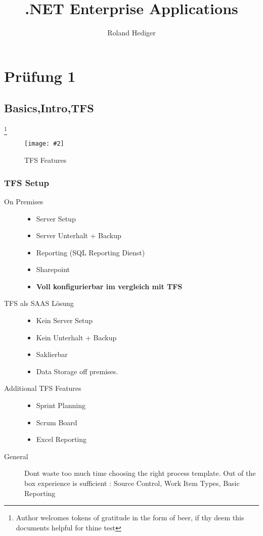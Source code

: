 \documentclass[a4paper,10pt]{scrreprt}
\title{.NET Enterprise Applications}
\author{Roland Hediger}
\newcommand{\pic}[2][figure]{\begin{figure}[h]
 \centering
 \texttt{[image: \#2]}
 \caption{#1}
\end{figure}
}
\begin{document}
\maketitle
\tableofcontents
\newpage
 \pagestyle{fancy}

\part{Prüfung 1}
\chapter{Basics,Intro,TFS}
\footnote{Author welcomes tokens of gratitude in the form of beer, if thy deem this documents helpful for thine test}
\pic[TFS Features]{tfs.png}
\section{TFS Setup}
\begin{description}
\item[On Premises] \begin{itemize}
\item Server Setup
\item Server Unterhalt + Backup
\item Reporting (SQL Reporting Dienst)
\item Sharepoint
\item \textbf{Voll konfigurierbar im vergleich mit TFS}
\end{itemize}
\item[TFS als SAAS Lösung]
\begin{itemize}
\item Kein Server Setup
\item Kein Unterhalt + Backup
\item Saklierbar
\item Data Storage off premises.
\end{itemize}
\item[Additional TFS Features]
\begin{itemize}
\item Sprint Planning
\item Scrum Board
\item Excel Reporting
\end{itemize}
\item [General] Dont waste too much time choosing the right process template. Out of the box experience is sufficient : Source Control, Work Item Types, Basic Reporting
\end{description}
\end{document}

